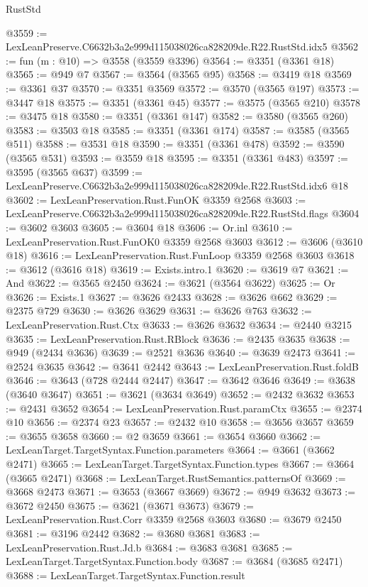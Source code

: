 \begin{lexlean}{RustStd}
\begin{coremodule}
@3559 := LexLeanPreserve.C6632b3a2e999d115038026ca828209de.R22.RustStd.idx5
@3562 := fun (m : @10) => @3558 (@3559 @3396)
@3564 := @3351 (@3361 @18)
@3565 := @949 @7
@3567 := @3564 (@3565 @95)
@3568 := @3419 @18
@3569 := @3361 @37
@3570 := @3351 @3569
@3572 := @3570 (@3565 @197)
@3573 := @3447 @18
@3575 := @3351 (@3361 @45)
@3577 := @3575 (@3565 @210)
@3578 := @3475 @18
@3580 := @3351 (@3361 @147)
@3582 := @3580 (@3565 @260)
@3583 := @3503 @18
@3585 := @3351 (@3361 @174)
@3587 := @3585 (@3565 @511)
@3588 := @3531 @18
@3590 := @3351 (@3361 @478)
@3592 := @3590 (@3565 @531)
@3593 := @3559 @18
@3595 := @3351 (@3361 @483)
@3597 := @3595 (@3565 @637)
@3599 := LexLeanPreserve.C6632b3a2e999d115038026ca828209de.R22.RustStd.idx6 @18
@3602 := LexLeanPreservation.Rust.FunOK @3359 @2568
@3603 := LexLeanPreserve.C6632b3a2e999d115038026ca828209de.R22.RustStd.flags
@3604 := @3602 @3603
@3605 := @3604 @18
@3606 := Or.inl
@3610 := LexLeanPreservation.Rust.FunOK0 @3359 @2568 @3603
@3612 := @3606 (@3610 @18)
@3616 := LexLeanPreservation.Rust.FunLoop @3359 @2568 @3603
@3618 := @3612 (@3616 @18)
@3619 := Exists.intro.{1}
@3620 := @3619 @7
@3621 := And
@3622 := @3565 @2450
@3624 := @3621 (@3564 @3622)
@3625 := Or
@3626 := Exists.{1}
@3627 := @3626 @2433
@3628 := @3626 @662
@3629 := @2375 @729
@3630 := @3626 @3629
@3631 := @3626 @763
@3632 := LexLeanPreservation.Rust.Ctx
@3633 := @3626 @3632
@3634 := @2440 @3215
@3635 := LexLeanPreservation.Rust.RBlock
@3636 := @2435 @3635
@3638 := @949 (@2434 @3636)
@3639 := @2521 @3636
@3640 := @3639 @2473
@3641 := @2524 @3635
@3642 := @3641 @2442
@3643 := LexLeanPreservation.Rust.foldB
@3646 := @3643 (@728 @2444 @2447)
@3647 := @3642 @3646
@3649 := @3638 (@3640 @3647)
@3651 := @3621 (@3634 @3649)
@3652 := @2432 @3632
@3653 := @2431 @3652
@3654 := LexLeanPreservation.Rust.paramCtx
@3655 := @2374 @10
@3656 := @2374 @23
@3657 := @2432 @10
@3658 := @3656 @3657
@3659 := @3655 @3658
@3660 := @2 @3659
@3661 := @3654 @3660
@3662 := LexLeanTarget.TargetSyntax.Function.parameters
@3664 := @3661 (@3662 @2471)
@3665 := LexLeanTarget.TargetSyntax.Function.types
@3667 := @3664 (@3665 @2471)
@3668 := LexLeanTarget.RustSemantics.patternsOf
@3669 := @3668 @2473
@3671 := @3653 (@3667 @3669)
@3672 := @949 @3632
@3673 := @3672 @2450
@3675 := @3621 (@3671 @3673)
@3679 := LexLeanPreservation.Rust.Corr @3359 @2568 @3603
@3680 := @3679 @2450
@3681 := @3196 @2442
@3682 := @3680 @3681
@3683 := LexLeanPreservation.Rust.Jd.b
@3684 := @3683 @3681
@3685 := LexLeanTarget.TargetSyntax.Function.body
@3687 := @3684 (@3685 @2471)
@3688 := LexLeanTarget.TargetSyntax.Function.result

\end{coremodule}
\end{lexlean}
